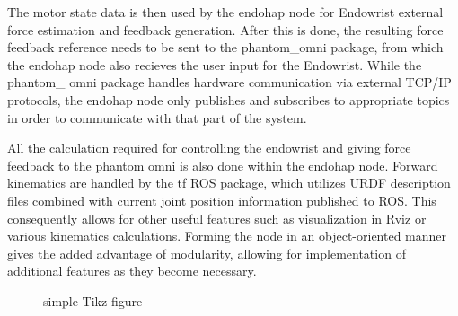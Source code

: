 The motor state data is then used by the endohap node for Endowrist external force estimation and feedback generation.
After this is done, the resulting force feedback reference needs to be sent to the phantom\_omni package, from which the endohap node also recieves the user input for the Endowrist. While the phantom\_ omni package handles hardware communication via external TCP/IP protocols, the endohap node only publishes and subscribes to appropriate topics in order to communicate with that part of the system.

All the calculation required for controlling the endowrist and giving force feedback to the phantom omni is also done within the endohap node. Forward kinematics are handled by the tf ROS package, which utilizes URDF description files combined with current joint position information published to ROS.
This consequently allows for other useful features such as visualization in Rviz or various kinematics calculations.
Forming the node in an object-oriented manner gives the added advantage of modularity, allowing for implementation of additional features as they become necessary. 

\begin{figure}[H]
\centering
{}%
\caption{simple Tikz figure}
\end{figure}
